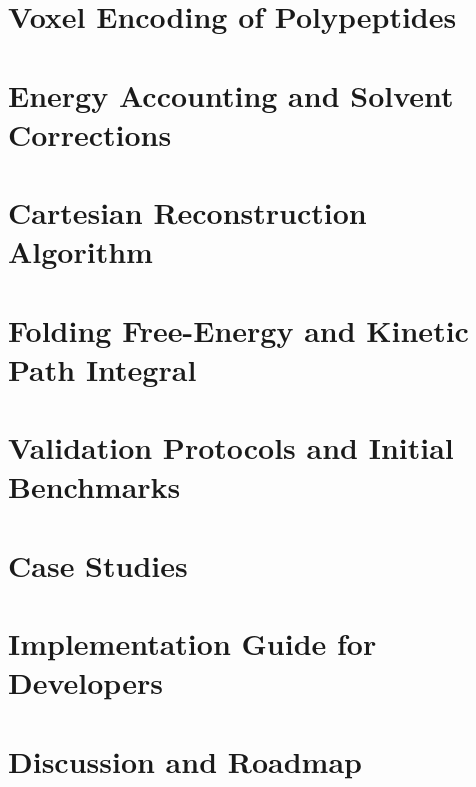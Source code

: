\documentclass[11pt]{article}
\begin{document}
\section{Voxel Encoding of Polypeptides}\label{sec:voxel}

\section{Energy Accounting and Solvent Corrections}\label{sec:energy}

\section{Cartesian Reconstruction Algorithm}\label{sec:coords}

\section{Folding Free-Energy and Kinetic Path Integral}\label{sec:kinetics}

\section{Validation Protocols and Initial Benchmarks}\label{sec:validation}

\section{Case Studies}\label{sec:cases}

\section{Implementation Guide for Developers}\label{sec:implementation}

\section{Discussion and Roadmap}\label{sec:discussion}
\end{document}
